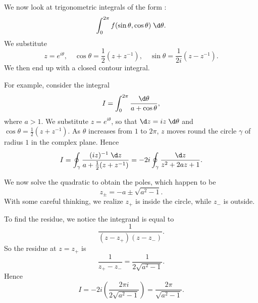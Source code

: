 \documentclass[a4paper]{article}
\begin{document}
\begin{eg}
  We now look at trigonometric integrals of the form :
  \[
    \int_0^{2\pi} f(\sin \theta, \cos \theta)\;\d \theta.
  \]
  We substitute
  \[
    z = e^{i\theta},\quad \cos \theta = \frac{1}{2}(z + z^{-1}),\quad \sin \theta = \frac{1}{2i}(z - z^{-1}).
  \]
  We then end up with a closed contour integral.

  For example, consider the integral
  \[
    I = \int_0^{2\pi}\frac{\d \theta}{a + \cos \theta},
  \]
  where $a > 1$. We substitute $z = e^{i\theta}$, so that $\d z = iz\;\d \theta$ and $\cos \theta = \frac{1}{2}(z + z^{-1})$. As $\theta$ increases from $1$ to $2\pi$, $z$ moves round the circle $\gamma$ of radius $1$ in the complex plane. Hence
  \[
    I = \oint_{\gamma} \frac{(iz)^{-1}\;\d z}{a + \frac{1}{2}(z + z^{-1})} = -2i \oint_{\gamma} \frac{\d z}{z^2 + 2az + 1}.
  \]
  \begin{center}
  \end{center}
  We now solve the quadratic to obtain the poles, which happen to be
  \[
    z_{\pm} = -a \pm \sqrt{a^2 - 1}.
  \]
  With some careful thinking, we realize $z_+$ is inside the circle, while $z_-$ is outside.

  To find the residue, we notice the integrand is equal to
  \[
    \frac{1}{(z - z_+)(z - z_-)}.
  \]
  So the residue at $z = z_+$ is
  \[
    \frac{1}{z_+ - z_-} = \frac{1}{2\sqrt{a^2 - 1}}.
  \]
  Hence
  \[
    I = -2i\left(\frac{2\pi i}{2\sqrt{a^2 - 1}}\right) = \frac{2\pi}{\sqrt{a^2 - 1}}.
  \]
\end{eg}
\end{document}
